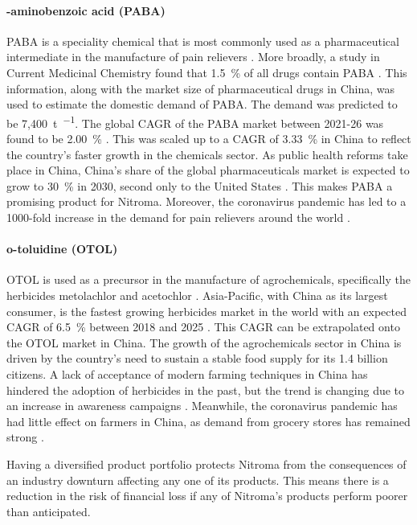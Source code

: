 \paragraph{\para-aminobenzoic acid (PABA)}
PABA is a speciality chemical that is most commonly used as a pharmaceutical intermediate in the manufacture of pain relievers \cite{pubchem_compound_2021}. More broadly, a study in Current Medicinal Chemistry found that \SI{1.5}{\percent} of all drugs contain PABA \cite{kluczyk_drug_2002}. This information, along with the market size of pharmaceutical drugs in China, was used to estimate the domestic demand of PABA. The demand was predicted to be 7,\SI{400}{\tonne\per\year}. The global CAGR of the PABA market between 2021-26 was found to be \SI{2.00}{\percent} \cite{wboc_global_2021}. This was scaled up to a CAGR of \SI{3.33}{\percent} in China to reflect the country’s faster growth in the chemicals sector. As public health reforms take place in China, China’s share of the global pharmaceuticals market is expected to grow to \SI{30}{\percent} in 2030, second only to the United States \cite{allison_chinas_2021}. This makes PABA a promising product for Nitroma. Moreover, the coronavirus pandemic has led to a 1000-fold increase in the demand for pain relievers around the world \cite{beroe_inc_coronavirus_2020}.

\paragraph{o-toluidine (OTOL)}
OTOL is used as a precursor in the manufacture of agrochemicals, specifically the herbicides metolachlor and acetochlor \cite{ncbi_ortho-toluidine_nodate}. Asia-Pacific, with China as its largest consumer, is the fastest growing herbicides market in the world with an expected CAGR of \SI{6.5}{\percent} between 2018 and 2025 \cite{sumant_herbicides_2019}. This CAGR can be extrapolated onto the OTOL market in China. The growth of the agrochemicals sector in China is driven by the country’s need to sustain a stable food supply for its 1.4 billion citizens. A lack of acceptance of modern farming techniques in China has hindered the adoption of herbicides in the past, but the trend is changing due to an increase in awareness campaigns \cite{mordor_intelligence_china_2019}. Meanwhile, the coronavirus pandemic has had little effect on farmers in China, as demand from grocery stores has remained strong \cite{mordor_intelligence_china_2019}.

Having a diversified product portfolio protects Nitroma from the consequences of an industry downturn affecting any one of its products. This means there is a reduction in the risk of financial loss if any of Nitroma's products perform poorer than anticipated.

